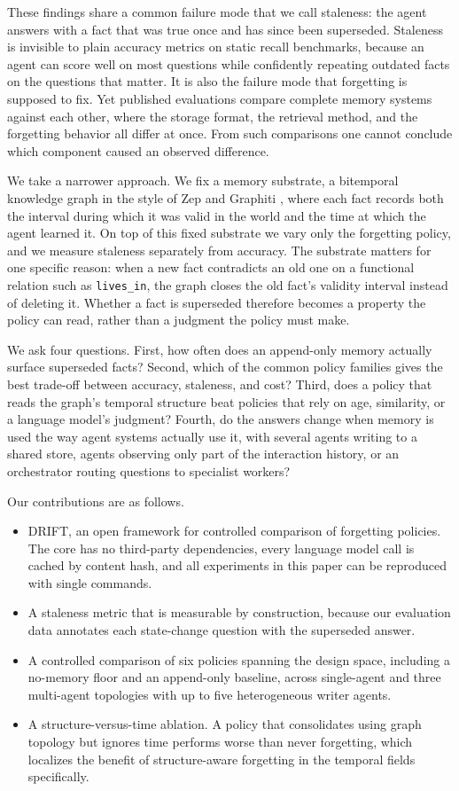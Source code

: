 \documentclass[letterpaper]{article} %
\begin{document}
These findings share a common failure mode that we call staleness: the agent answers with a fact that was true once and has since been superseded. Staleness is invisible to plain accuracy metrics on static recall benchmarks, because an agent can score well on most questions while confidently repeating outdated facts on the questions that matter. It is also the failure mode that forgetting is supposed to fix. Yet published evaluations compare complete memory systems against each other, where the storage format, the retrieval method, and the forgetting behavior all differ at once. From such comparisons one cannot conclude which component caused an observed difference.

We take a narrower approach. We fix a memory substrate, a bitemporal knowledge graph in the style of Zep and Graphiti \citep{rasmussen2025zep}, where each fact records both the interval during which it was valid in the world and the time at which the agent learned it. On top of this fixed substrate we vary only the forgetting policy, and we measure staleness separately from accuracy. The substrate matters for one specific reason: when a new fact contradicts an old one on a functional relation such as \texttt{lives\_in}, the graph closes the old fact's validity interval instead of deleting it. Whether a fact is superseded therefore becomes a property the policy can read, rather than a judgment the policy must make.

We ask four questions. First, how often does an append-only memory actually surface superseded facts? Second, which of the common policy families gives the best trade-off between accuracy, staleness, and cost? Third, does a policy that reads the graph's temporal structure beat policies that rely on age, similarity, or a language model's judgment? Fourth, do the answers change when memory is used the way agent systems actually use it, with several agents writing to a shared store, agents observing only part of the interaction history, or an orchestrator routing questions to specialist workers?

Our contributions are as follows.
\begin{itemize}
\item DRIFT, an open framework for controlled comparison of forgetting policies. The core has no third-party dependencies, every language model call is cached by content hash, and all experiments in this paper can be reproduced with single commands.
\item A staleness metric that is measurable by construction, because our evaluation data annotates each state-change question with the superseded answer.
\item A controlled comparison of six policies spanning the design space, including a no-memory floor and an append-only baseline, across single-agent and three multi-agent topologies with up to five heterogeneous writer agents.
\item A structure-versus-time ablation. A policy that consolidates using graph topology but ignores time performs worse than never forgetting, which localizes the benefit of structure-aware forgetting in the temporal fields specifically.
\end{itemize}
\end{document}
